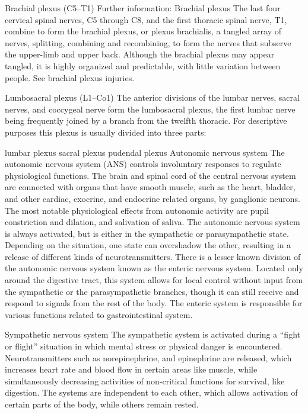 \documentclass[]{book}
\begin{document}
Brachial plexus (C5--T1)
Further information: Brachial plexus
The last four cervical spinal nerves, C5 through C8, and the first thoracic spinal nerve, T1, combine to form the brachial plexus, or plexus brachialis, a tangled array of nerves, splitting, combining and recombining, to form the nerves that subserve the upper-limb and upper back. Although the brachial plexus may appear tangled, it is highly organized and predictable, with little variation between people. See brachial plexus injuries.

Lumbosacral plexus (L1--Co1)
The anterior divisions of the lumbar nerves, sacral nerves, and coccygeal nerve form the lumbosacral plexus, the first lumbar nerve being frequently joined by a branch from the twelfth thoracic. For descriptive purposes this plexus is usually divided into three parts:

lumbar plexus
sacral plexus
pudendal plexus
Autonomic nervous system
The autonomic nervous system (ANS) controls involuntary responses to regulate physiological functions. The brain and spinal cord of the central nervous system are connected with organs that have smooth muscle, such as the heart, bladder, and other cardiac, exocrine, and endocrine related organs, by ganglionic neurons. The most notable physiological effects from autonomic activity are pupil constriction and dilation, and salivation of saliva. The autonomic nervous system is always activated, but is either in the sympathetic or parasympathetic state. Depending on the situation, one state can overshadow the other, resulting in a release of different kinds of neurotransmitters. There is a lesser known division of the autonomic nervous system known as the enteric nervous system. Located only around the digestive tract, this system allows for local control without input from the sympathetic or the parasympathetic branches, though it can still receive and respond to signals from the rest of the body. The enteric system is responsible for various functions related to gastrointestinal system.

Sympathetic nervous system
The sympathetic system is activated during a ``fight or flight'' situation in which mental stress or physical danger is encountered. Neurotransmitters such as norepinephrine, and epinephrine are released, which increases heart rate and blood flow in certain areas like muscle, while simultaneously decreasing activities of non-critical functions for survival, like digestion. The systems are independent to each other, which allows activation of certain parts of the body, while others remain rested.
\end{document}
